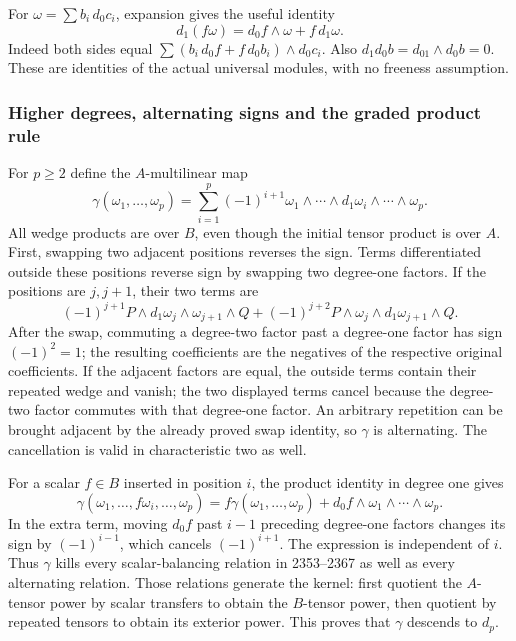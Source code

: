 For \(\omega=\sum b_i\,d_0c_i\), expansion gives the useful identity \[
d_1(f\omega)=d_0f\wedge\omega+f\,d_1\omega.
\] Indeed both sides equal \(\sum (b_i\,d_0f+f\,d_0b_i)\wedge d_0c_i\). Also \(d_1d_0b=d_01\wedge d_0b=0\). These are identities of the actual universal modules, with no freeness assumption.

\subsubsection{Higher degrees, alternating signs and the graded product rule}\label{algebra-proof-042-higher-degrees-alternating-signs-and-the-graded-product-rule}

For \(p\ge2\) define the \(A\)-multilinear map \[
\gamma(\omega_1,\ldots,\omega_p)
=\sum_{i=1}^p(-1)^{i+1}\omega_1\wedge\cdots\wedge d_1\omega_i\wedge\cdots\wedge\omega_p.
\] All wedge products are over \(B\), even though the initial tensor product is over \(A\). First, swapping two adjacent positions reverses the sign. Terms differentiated outside these positions reverse sign by swapping two degree-one factors. If the positions are \(j,j+1\), their two terms are \[
(-1)^{j+1}P\wedge d_1\omega_j\wedge\omega_{j+1}\wedge Q
+(-1)^{j+2}P\wedge\omega_j\wedge d_1\omega_{j+1}\wedge Q.
\] After the swap, commuting a degree-two factor past a degree-one factor has sign \((-1)^2=1\); the resulting coefficients are the negatives of the respective original coefficients. If the adjacent factors are equal, the outside terms contain their repeated wedge and vanish; the two displayed terms cancel because the degree-two factor commutes with that degree-one factor. An arbitrary repetition can be brought adjacent by the already proved swap identity, so \(\gamma\) is alternating. The cancellation is valid in characteristic two as well.

For a scalar \(f\in B\) inserted in position \(i\), the product identity in degree one gives \[
\gamma(\omega_1,\ldots,f\omega_i,\ldots,\omega_p)
=f\gamma(\omega_1,\ldots,\omega_p)
+d_0f\wedge\omega_1\wedge\cdots\wedge\omega_p.
\] In the extra term, moving \(d_0f\) past \(i-1\) preceding degree-one factors changes its sign by \((-1)^{i-1}\), which cancels \((-1)^{i+1}\). The expression is independent of \(i\). Thus \(\gamma\) kills every scalar-balancing relation in 2353--2367 as well as every alternating relation. Those relations generate the kernel: first quotient the \(A\)-tensor power by scalar transfers to obtain the \(B\)-tensor power, then quotient by repeated tensors to obtain its exterior power. This proves that \(\gamma\) descends to \(d_p\).

